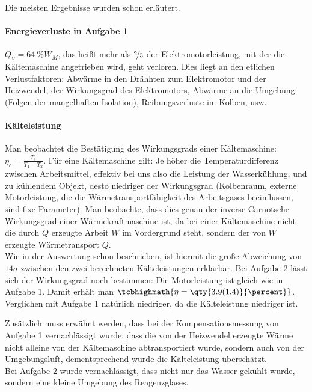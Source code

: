 Die meisten Ergebnisse wurden schon erläutert. 
\paragraph{Energieverluste in Aufgabe 1}
\(Q_V=\qty{64}{\percent}W_M\), das heißt mehr als \(\nicefrac{2}{3}\) der Elektromotorleistung, mit der die Kältemaschine angetrieben wird, geht verloren. Dies liegt an den etlichen Verlustfaktoren:  Abwärme in den Drähhten zum Elektromotor und der Heizwendel, der Wirkungsgrad des Elektromotors, Abwärme an die Umgebung (Folgen der mangelhaften Isolation), Reibungsverluste im Kolben, usw.

\paragraph{Kälteleistung}
Man beobachtet die Bestätigung des Wirkungsgrads einer Kältemaschine: \(\eta_c=\frac{T_1}{T_1-T_2}\). Für eine Kältemaschine gilt: Je höher die Temperaturdifferenz zwischen Arbeitsmittel, effektiv bei uns also die Leistung der Wasserkühlung, und zu kühlendem Objekt, desto niedriger der Wirkungsgrad (Kolbenraum, externe Motorleistung, die die Wärmetransportfähigkeit des Arbeitsgases beeinflussen, sind fixe Parameter). Man beobachte, dass dies genau der inverse Carnotsche Wirkungsgrad einer Wärmekraftmaschine ist, da bei einer Kältemaschine nicht die durch \(Q\) erzeugte Arbeit \(W\) im Vordergrund steht, sondern der von \(W\) erzeugte Wärmetransport \(Q\).\\ Wie in der Auswertung schon beschrieben, ist hiermit die große Abweichung von \(14\sigma\) zwischen den zwei berechneten Kälteleistungen erklärbar. Bei Aufgabe 2 lässt sich der Wirkungsgrad noch bestimmen: Die Motorleistung ist gleich wie in Aufgabe 1. Damit erhält man \(\tcbhighmath{\eta=\qty{3.9(1.4)}{\percent}}\). Verglichen mit Aufgabe 1 natürlich niedriger, da die Kälteleistung niedriger ist.

Zusätzlich muss erwähnt werden, dass bei der Kompensationsmessung von Aufgabe 1 vernachlässigt wurde, dass die von der Heizwendel erzeugte Wärme nicht alleine von der Kältemaschine abtransportiert wurde, sondern auch von der Umgebungsluft, dementsprechend wurde die Kälteleistung überschätzt.\\
Bei Aufgabe 2 wurde vernachlässigt, dass nicht nur das Wasser gekühlt wurde, sondern eine kleine Umgebung des Reagenzglases. 


